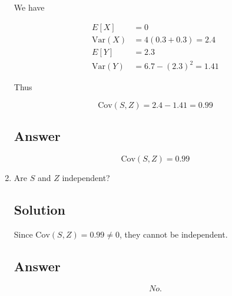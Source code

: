 \documentclass[12pt]{article}
\begin{document}
\begin{enumerate}[start=1,label={\bfseries Part \arabic*:},leftmargin=0in]
			We have
			
			\[
				\begin{aligned}
					E[X]&=0\\
					\mathrm{Var}(X)&=4(0.3+0.3)=2.4\\
					E[Y]&=2.3\\
					\mathrm{Var}(Y)&=6.7-(2.3)^2=1.41
				\end{aligned}
			\]
			
			Thus
			
			\[
				\mathrm{Cov}(S,Z)=2.4-1.41=0.99
			\]
		
		\subsection*{Answer}
		
			\[\boxed{\mathrm{Cov}(S,Z)=0.99}\]
		
		\bigskip\item Are $S$ and $Z$ independent?
		
		\subsection*{Solution}
		
			Since $\mathrm{Cov}(S,Z)=0.99\ne0$, they cannot be independent.
		
		\subsection*{Answer}
		
		\[\boxed{No.}\]
	\end{enumerate}
	
\end{document}
